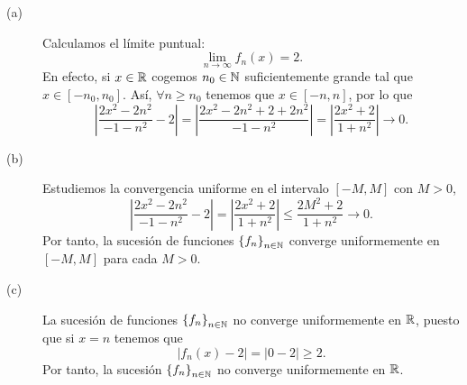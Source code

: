 \documentclass{article}
\begin{document}
\begin{sol}
\begin{description}
\item[(a)] Calculamos el límite puntual:
	\[\lim_{n \to \infty}f_{n}\left(x\right) = 2 .\]
	En efecto, si $\displaystyle x \in \mathbb{R} $ cogemos $\displaystyle n_{0} \in \mathbb{N} $ suficientemente grande tal que $\displaystyle x \in \left[-n_{0},n_{0}\right]  $. Así, $\displaystyle \forall n \geq n_{0} $ tenemos que $\displaystyle x \in \left[-n, n\right]  $, por lo que 
	\[ \left|\frac{2x^{2}-2n^{2}}{-1-n^{2}}-2\right| = \left|\frac{2x^{2}-2n^{2}+2+2n^{2}}{-1-n^{2}}\right| = \left|\frac{2x^{2}+2}{1+n^{2}}\right| \to 0 .\]
\item[(b)] Estudiemos la convergencia uniforme en el intervalo $\displaystyle \left[-M,M\right]  $ con $\displaystyle M > 0 $,
	\[ \left|\frac{2x^{2}-2n^{2}}{-1-n^{2}}-2\right| = \left|\frac{2x^{2}+2}{1 + n^{2}}\right| \leq \frac{2M^{2}+2}{1+n^{2}} \to 0 .\]
	Por tanto, la sucesión de funciones $\displaystyle \left\{ f_{n}\right\} _{n\in\mathbb{N}} $ converge uniformemente en $\displaystyle \left[-M, M\right]  $ para cada $\displaystyle M > 0 $.
\item[(c)] La sucesión de funciones $\displaystyle \left\{ f_{n}\right\} _{n\in\mathbb{N}} $ no converge uniformemente en $\displaystyle \mathbb{R} $, puesto que si $\displaystyle x = n $ tenemos que 
	\[ \left|f_{n}\left(x\right)-2\right| = \left|0 - 2\right| \geq 2 .\]
	Por tanto, la sucesión $\displaystyle \left\{ f_{n}\right\} _{n\in\mathbb{N}} $ no converge uniformemente en $\displaystyle \mathbb{R} $.
\end{description}

\end{sol}
\end{document}
